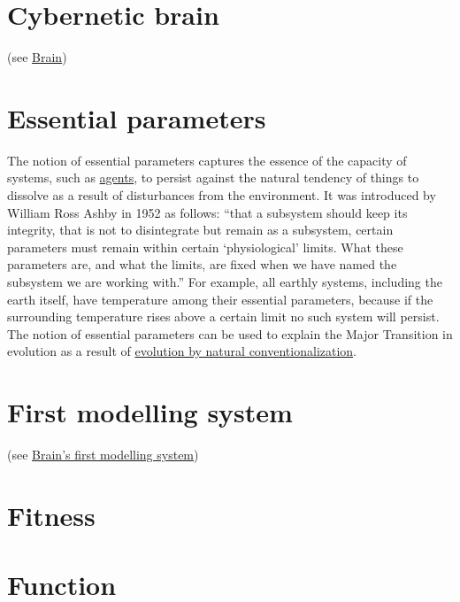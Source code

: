 \documentclass[12pt]{article}
\begin{document}
\hypertarget{cybernetic_brain}{}
\section{Cybernetic brain} (see \hyperlink{brain}{Brain})


\hypertarget{essential_parameters}{}
\section{Essential parameters}
The notion of essential parameters captures the essence of the
capacity of systems, such as \hyperlink{agent}{agents}, to persist
against the natural tendency of things to dissolve as a result of
disturbances from the environment. It was introduced by William Ross
Ashby in 1952 as follows: ``that a subsystem should keep its
integrity, that is not to disintegrate but remain as a subsystem,
certain parameters must remain within certain `physiological'
limits. What these parameters are, and what the limits, are fixed when
we have named the subsystem we are working with.''
\cite{Ashby_1952_design_brain} For example, all earthly systems,
including the earth itself, have temperature among their essential
parameters, because if the surrounding temperature rises above a
certain limit no such system will persist. The notion of essential
parameters can be used to explain the Major Transition in evolution as
a result of \hyperlink{natural_conventionalization}{evolution by
  natural conventionalization}.

\hypertarget{first_modelling_system}{}
\section{First modelling system} (see \hyperlink{brains_first_modelling_system}{Brain's first modelling system})

\hypertarget{fitness}{}
\section{Fitness}

\hypertarget{function}{}
\section{Function}
\end{document}
